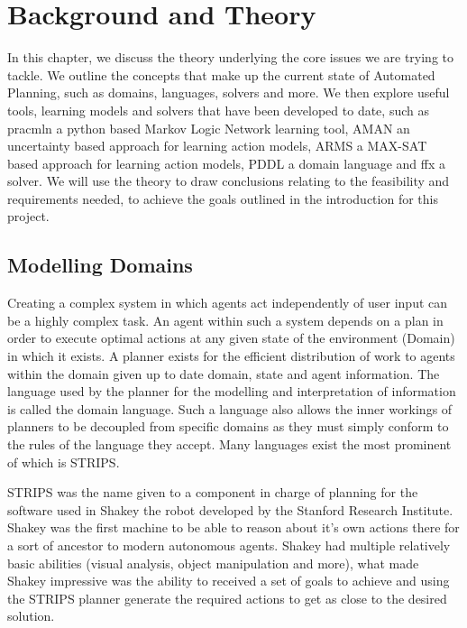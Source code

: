 \chapter{Background and Theory}
In this chapter, we discuss the theory underlying the core issues we are trying to tackle. We outline the concepts that make up the current state of Automated Planning, such as domains, languages, solvers and more. We then explore useful tools, learning models and solvers that have been developed to date, such as pracmln a python based Markov Logic Network learning tool, AMAN an uncertainty based approach for learning action models, ARMS a MAX-SAT based approach for learning action models, PDDL a domain language and ffx a solver. We will use the theory to draw conclusions relating to the feasibility and requirements needed, to achieve the goals outlined in the introduction for this project.


\section{Modelling Domains}
Creating a complex system in which agents act independently of user input can be a highly complex task. An agent within such a system depends on a plan in order to execute optimal actions at any given state of the environment (Domain) in which it exists. A planner exists for the efficient distribution of work to agents within the domain given up to date domain, state and agent information. The language used by the planner for the modelling and interpretation of information is called the domain language. Such a language also allows the inner workings of planners to be decoupled from specific domains as they must simply conform to the rules of the language they accept. Many languages exist the most prominent of which is STRIPS.

STRIPS was the name given to a component in charge of planning for the software used in Shakey the robot developed by the Stanford Research Institute. Shakey was the first machine to be able to reason about it's own actions there for a sort of ancestor to modern autonomous agents. Shakey had multiple relatively basic abilities (visual analysis, object manipulation and more), what made Shakey impressive was the ability to received a set of goals to achieve and using the STRIPS planner generate the required actions to get as close to the desired solution.
\newpage

